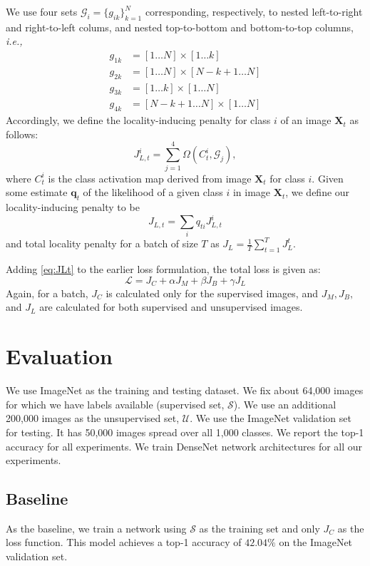 \documentclass[runningheads]{llncs}
\begin{document}
We use four sets $\mathcal G_i = \{g_{ik}\}_{k=1}^N$ corresponding, respectively, to nested
left-to-right and right-to-left colums, and nested top-to-bottom and bottom-to-top columns,
\textit{i.e.,}
\begin{align}
  g_{1k} & = [1 \ldots N] \times [1 \ldots k] \\
  g_{2k} & = [1 \ldots N] \times [N-k+1 \ldots N] \\
  g_{3k} & = [1 \ldots k] \times [1 \ldots N] \\
  g_{4k} & = [N-k+1 \ldots N] \times [1 \ldots N]
\end{align}
Accordingly, we define the locality-inducing penalty for class $i$ of an image $\mathbf{X}_t$ as follows:
\begin{equation} \label{eq:JLt}
	J_{L,t}^{i} = \sum_{j=1}^{4}\Omega(C^i_t, \mathcal G_j),
\end{equation}
where $C^i_{t}$ is the class activation map \cite{CAM} derived from image $\mathbf X_t$ for class
$i$. Given some estimate $\mathbf q_{t}$ of the likelihood of a given class $i$ in image $\mathbf
X_t$, we define our locality-inducing penalty to be
\begin{equation}
  J_{L,t} = \sum_{i} q_{ti} J_{L,t}^i
\end{equation}
and total locality penalty for a batch of size $T$ as $J_L =  \frac{1}{T} \sum_{t=1}^T J_L^t$. 

Adding \eqref{eq:JLt} to the earlier loss formulation, the total loss is given as:
\begin{equation}
	\mathcal{L} = J_C + \alpha J_M + \beta J_B + \gamma J_L
\end{equation}
Again, for a batch, $J_C$ is calculated only for the supervised images, and $J_M, J_B, $ and $J_L$
are calculated for both supervised and unsupervised images.


\section{Evaluation}
We use ImageNet as the training and testing dataset. We fix about 64,000 images for which
we have labels available (supervised set, $\mathcal{S}$). We use an additional 200,000 images as the
unsupervised set, $\mathcal{U}$. We use the ImageNet validation set for testing. It has 50,000
images spread over all 1,000 classes. We report the top-1 accuracy for all experiments. We train
DenseNet network architectures for all our experiments.

\subsection{Baseline}
As the baseline, we train a network using $\mathcal{S}$ as the training set and only $J_C$ as the loss
function. This model achieves a top-1 accuracy of $42.04\%$ on the ImageNet validation set. 
\end{document}

